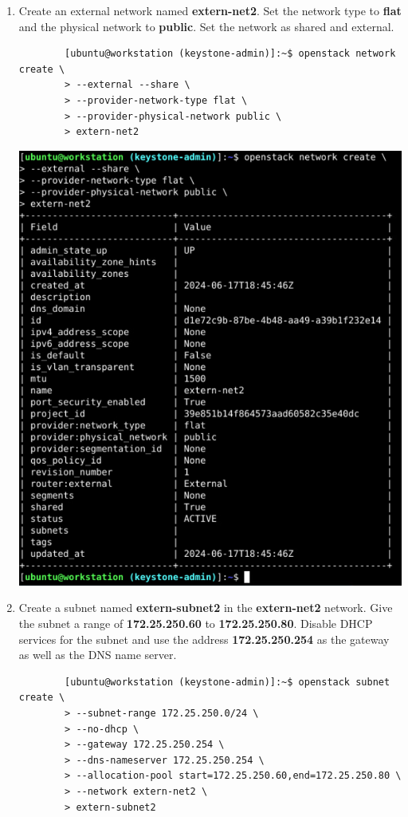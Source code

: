\documentclass[letterpaper, 12pt]{article}
\begin{document}
\begin{enumerate}
    \item Create an external network named \textbf{extern-net2}. Set the network type to \textbf{flat} and the physical
    network to \textbf{public}. Set the network as shared and external.
    \begin{lstlisting}
        [ubuntu@workstation (keystone-admin)]:~$ openstack network create \
        > --external --share \
        > --provider-network-type flat \
        > --provider-physical-network public \
        > extern-net2
    \end{lstlisting}

    \begin{center}
        \includegraphics[width=\linewidth]{images/part1/step15.png}
    \end{center}

    \item Create a subnet named \textbf{extern-subnet2} in the \textbf{extern-net2} network. Give the subnet a range of
    \textbf{172.25.250.60} to \textbf{172.25.250.80}. Disable DHCP services for the subnet and use the address
    \textbf{172.25.250.254} as the gateway as well as the DNS name server.
    \begin{lstlisting}
        [ubuntu@workstation (keystone-admin)]:~$ openstack subnet create \
        > --subnet-range 172.25.250.0/24 \
        > --no-dhcp \
        > --gateway 172.25.250.254 \
        > --dns-nameserver 172.25.250.254 \
        > --allocation-pool start=172.25.250.60,end=172.25.250.80 \
        > --network extern-net2 \
        > extern-subnet2
    \end{lstlisting}


\end{enumerate}
\end{document}
